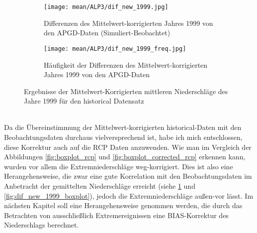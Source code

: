 \begin{figure}[hbt!]
	\begin{subfigure}{0.49\textwidth}
			\texttt{[image: mean/ALP3/dif\_new\_1999.jpg]}
		\caption{Differenzen des Mittelwert-korrigierten Jahres 1999 von den APGD-Daten (Simuliert-Beobachtet)}
		\label{fig:dif_new_1999}
	\end{subfigure}
	\begin{subfigure}{0.49\textwidth}
		\texttt{[image: mean/ALP3/dif\_new\_1999\_freq.jpg]}
		\caption{Häufigkeit der Differenzen des Mittelwert-korrigierten Jahres 1999 von den APGD-Daten}
		\label{fig:dif_new_1999_freq}
	\end{subfigure}
	
\caption{Ergebnisse der Mittelwert-Korrigierten mittleren Niederschläge des Jahre 1999 für den historical Datensatz} 
\end{figure}
\hfil\\
Da die Übereinstimmung der Mittelwert-korrigierten historical-Daten mit den Beobachtungsdaten durchaus vielversprechend ist, habe ich mich entschlossen, diese Korrektur auch auf die RCP Daten anzuwenden. Wie man im Vergleich der Abbildungen \ref{fig:boxplot_rcp} und \ref{fig:boxplot_corrected_rcp} erkennen kann, wurden vor allem die Extremniederschläge weg-korrigiert. Dies ist also eine Herangehensweise, die zwar eine gute Korrelation mit den Beobachtungsdaten im Anbetracht der gemittelten Niederschläge erreicht (siehe \ref{fig:dif_new_1999} und \ref{fig:dif_new_1999_boxplot}), jedoch die Extremniederschläge außen-vor lässt. Im nächsten Kapitel soll eine Herangehensweise genommen werden, die durch das Betrachten von ausschließlich Extremereignissen eine BIAS-Korrektur des Niederschlags berechnet.\\
